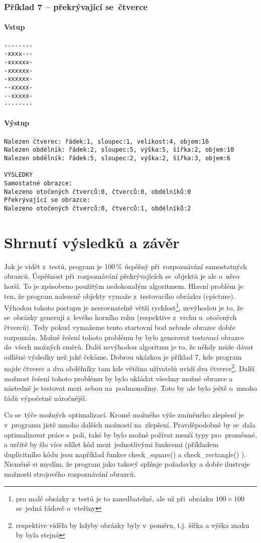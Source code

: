 \documentclass[12pt]{article}
\begin{document}
\subsubsection{Příklad 7 -- překrývající se~čtverce}
\paragraph{Vstup}
\begin{verbatim}
--------
-xxxx---
-xxxxxx-
-xxxxxx-
-xxxxxx-
--xxxxx-
--xxxxx-
--------
\end{verbatim}
\paragraph{Výstup}
\begin{verbatim}
Nalezen čtverec: řádek:1, sloupec:1, velikost:4, objem:16 
Nalezen obdélník: řádek:2, sloupec:5, výška:5, šířka:2, objem:10 
Nalezen obdélník: řádek:5, sloupec:2, výška:2, šířka:3, objem:6 

VÝSLEDKY
Samostatné obrazce:
Nalezeno otočených čtverců:0, čtverců:0, obdélníků:0
Překrývající se obrazce:
Nalezeno otočených čtverců:0, čtverců:1, obdélníků:2
\end{verbatim}

\section{Shrnutí výsledků a závěr}
Jak je vidět z~testů, program je 100\,\% úspěšný při~rozpoznávání samostatných obrazců. Úspěšnost při~rozpoznávání překrývajících se~objektů je ale o~něco horší. To je způsobeno použitým nedokonalým algoritmem. Hlavní problém je ten, že program nalezené objekty vymaže z~testovacího obrázku (cpicture). Výhodou tohoto postupu je nesrovnatelně větší rychlost\footnote{pro malé obrázky z~testů je to zanedbatelné, ale už při~obrázku $100 \times 100$ se~jedná řádově o~vteřiny}, nevýhodou je to, že se~obrázky generují z~levého horního rohu (respektive z~vrchu u~otočených čtverců). Tedy pokud vymažeme tento startovní bod nebude obrazec dobře rozpoznán. Možné řešení tohoto problému by bylo generovat testovací obrazce do~všech možných směrů. Další nevýhodou algoritmu je to, že někdy může dávat odlišné výsledky než jaké čekáme. Dobrou ukázkou je příklad 7, kde program najde čtverec a dva obdélníky tam kde většina uživatelů uvidí dva čtverce\footnote{respektive viděla by kdyby obrázky byly v~poměru, t.j. šířka a výška znaku by byla stejná}. Další možnost řešení tohoto problému by bylo ukládat všechny možné obrazce a nástedně je testovat mezi~sebou na~podmonožiny. Toto by ale bylo ještě o~mnoho řádů výpočetně náročnější.

Co se~týče možných optimalizací. Kromě možného výše zmíněného zlepšení je v~programu jistě mnoho dalších možností na~zlepšení. Pravděpodobně by se~dala optimalizovat práce s~poli, také by bylo možné požívat menší typy pro~proměnné, a určitě by šlo více sdílet kód mezi~jednotlivými funkcemi (příkladem duplicitního kódu jsou například funkce check\_square() a check\_rectangle() ). Nicméně si myslím, že program jako takový splňuje požadavky a dobře ilustruje možnosti strojového rozpoznávání obrazců. 
\end{document}
